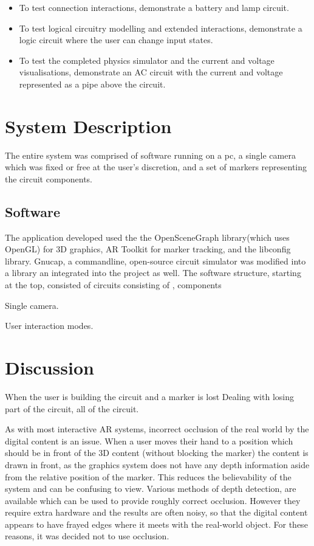 \begin{itemize}
\item To test connection interactions, demonstrate a battery and lamp circuit.
\item To test logical circuitry modelling and extended interactions, demonstrate a logic circuit where the user can change input states.
\item To test the completed physics simulator and the current and voltage visualisations, demonstrate an AC circuit with the current and voltage represented as a pipe above the circuit.
\end{itemize}

\section{System Description}
The entire system was comprised of software running on a pc, a single camera which was fixed or free at the user's discretion, and a set of markers representing the circuit components.

\subsection{Software}
The application developed used the the OpenSceneGraph library(which uses OpenGL) for 3D graphics, AR Toolkit for marker tracking, and the libconfig library. Gnucap, a commandline, open-source circuit simulator was modified into a library an integrated into the project as well. The software structure, starting at the top, consisted of circuits consisting of , components  

Single camera.

User interaction modes.

\section{Discussion}

When the user is building the circuit and a marker is lost
Dealing with losing part of the circuit, all of the circuit.

As with most interactive AR systems, incorrect occlusion of the real world by the digital content is an issue. When a user moves their hand to a position which should be in front of the 3D content (without blocking the marker) the content is drawn in front, as the graphics system does not have any depth information aside from the relative position of the marker. This reduces the believability of the system and can be confusing to view. Various methods of depth detection, are available which can be used to provide roughly correct occlusion. However they require extra hardware and the results are often noisy, so that the digital content appears to have frayed edges where it meets with the real-world object. For these reasons, it was decided not to use occlusion.

